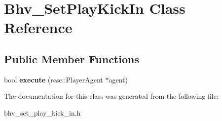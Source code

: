 \hypertarget{classBhv__SetPlayKickIn}{
\section{Bhv\_\-SetPlayKickIn Class Reference}
\label{classBhv__SetPlayKickIn}
}
\subsection*{Public Member Functions}
\begin{DoxyCompactItemize}
\item 
\hypertarget{classBhv__SetPlayKickIn_a64aeaeae58268e6cbb22e538de883268}{
bool {\bfseries execute} (rcsc::PlayerAgent $\ast$agent)}
\label{classBhv__SetPlayKickIn_a64aeaeae58268e6cbb22e538de883268}

\end{DoxyCompactItemize}


The documentation for this class was generated from the following file:\begin{DoxyCompactItemize}
\item 
bhv\_\-set\_\-play\_\-kick\_\-in.h\end{DoxyCompactItemize}

